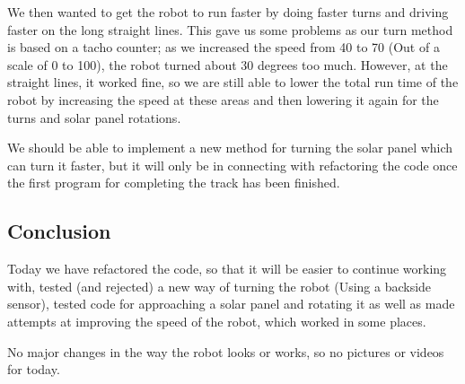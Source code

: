 We then wanted to get the robot to run faster by doing faster turns and
driving faster on the long straight lines. This gave us some problems as
our turn method is based on a tacho counter; as we increased the speed
from 40 to 70 (Out of a scale of 0 to 100), the robot turned about 30
degrees too much. However, at the straight lines, it worked fine, so we
are still able to lower the total run time of the robot by increasing
the speed at these areas and then lowering it again for the turns and
solar panel rotations.

We should be able to implement a new method for turning the solar panel
which can turn it faster, but it will only be in connecting with
refactoring the code once the first program for completing the track has
been finished.

\subsection{Conclusion}

Today we have refactored the code, so that it will be easier to continue
working with, tested (and rejected) a new way of turning the robot
(Using a backside sensor), tested code for approaching a solar panel and
rotating it as well as made attempts at improving the speed of the
robot, which worked in some places.

No major changes in the way the robot looks or works, so no pictures or
videos for today.
